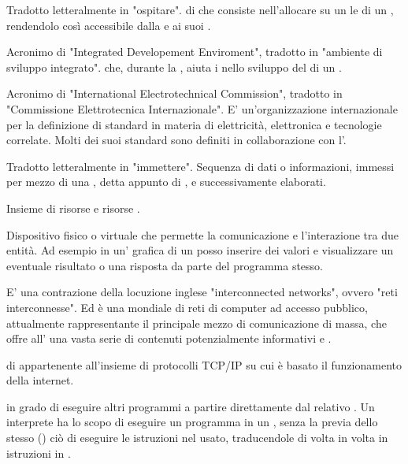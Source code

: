 {Tradotto letteralmente in "ospitare".  di  che consiste nell'allocare su un  le  di un , rendendolo così accessibile dalla   e ai suoi .}



{Acronimo di "Integrated Developement Enviroment", tradotto in "ambiente di sviluppo integrato".  che, durante la , aiuta i  nello sviluppo del  di un .}


{Acronimo di "International Electrotechnical Commission", tradotto in "Commissione Elettrotecnica Internazionale". E' un'organizzazione internazionale per la definizione di standard in materia di elettricità, elettronica e tecnologie correlate. Molti dei suoi standard sono definiti in collaborazione con l'.}


{Tradotto letteralmente in "immettere". Sequenza di dati o informazioni, immessi per mezzo di una , detta appunto di , e successivamente elaborati.}


{Insieme di risorse  e risorse .}


{Dispositivo fisico o virtuale che permette la comunicazione e l'interazione tra due entità. Ad esempio in un' grafica di un  posso inserire dei valori  e visualizzare un eventuale risultato o una risposta da parte del programma stesso.}


{E' una contrazione della locuzione inglese "interconnected networks", ovvero "reti interconnesse".
 Ed è una  mondiale di reti di computer ad accesso pubblico, attualmente rappresentante il principale mezzo di comunicazione di massa, che offre all' una vasta serie di contenuti potenzialmente informativi e .}


{ di  appartenente all'insieme di protocolli  TCP/IP su cui è basato il funzionamento della  internet.}



{ in grado di eseguire altri programmi a partire direttamente dal relativo . Un interprete ha lo scopo di eseguire un programma in un , senza la previa  dello stesso () ciò di eseguire le istruzioni nel  usato, traducendole di volta in volta in istruzioni in .}

